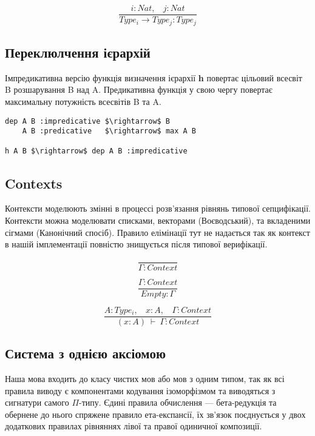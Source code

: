 \documentclass{article}
\begin{document}
\begin{equation}
\tag{$R_2$}
\dfrac
{i : Nat,\ \ \ \ j : Nat}
{Type_i \rightarrow Type_{j} : Type_{j}}
\end{equation}

\subsection{Переклюлчення ієрархій}
Імпредикативна версію функція визначення ієрархії {\bf h} повертає цільовий всесвіт B розшарування B над A.
Предикативна функція у свою чергу повертає максимальну потужність всесвітів B та A.

\begin{lstlisting}[mathescape=true]
dep A B :impredicative $\rightarrow$ B
    A B :predicative   $\rightarrow$ max A B

h A B $\rightarrow$ dep A B :impredicative
\end{lstlisting}

\subsection{Contexts}

Контексти моделюють змінні в процессі розв'язання рівнянь типової сепцифікації. Контексти можна моделювати
списками, векторами (Воєводський), та вкладеними сігмами (Канонічний спосіб). Правило елімінації тут не надається
так як контекст в нашій імплементації повністю знищується після типової верифікації.

\begin{equation}
\tag{Ctx-formation}
\dfrac
{}
{\Gamma : Context}
\end{equation}

\begin{equation}
\tag{Ctx-intro$_1$}
\dfrac
{\Gamma : Context}
{Empty : \Gamma}
\end{equation}

\begin{equation}
\tag{Ctx-intro$_2$}
\dfrac
{A : Type_i,\ \ \ \ x : A,\ \ \ \ \Gamma : Context}
{(x : A)\ \vdash\ \Gamma : Context}
\end{equation}

\subsection{Система з однією аксіомою}

Наша мова входить до класу чистих мов або мов з одним типом, так
як всі правила виводу є компонентами кодування ізоморфізмом та виводяться з сигнатури самого $\Pi$-типу.
Єдині правила обчислення — бета-редукція та обернене до нього спряжене правило ета-експансії, їх зв'язок поєднується у двох
додаткових правилах рівняннях лівої та правої одиничної композиції.
\end{document}
